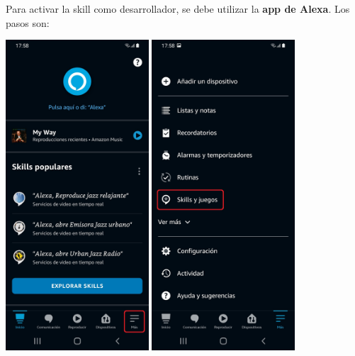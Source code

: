 \documentclass[11pt,spanish,listoffigures,listoftables,table,hyphens,dvipsnames]{tfgetsinf}
\begin{document}
Para activar la skill como desarrollador, se debe utilizar la \textbf{app de Alexa}. Los pasos son:

\includegraphics[width=0.4\textwidth]{activate-skill-1.jpg}
\includegraphics[width=0.4\textwidth]{activate-skill-2.jpg}
\end{document}
